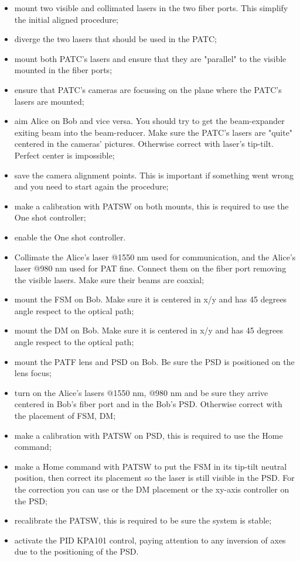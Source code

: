 \begin{itemize}
  \item mount two visible and collimated lasers in the two fiber ports. This simplify the initial aligned procedure;
  \item diverge the two lasers that should be used in the PATC;
  \item mount both PATC's lasers and ensure that they are "parallel" to the visible mounted in the fiber ports;
  \item ensure that PATC's cameras are focussing on the plane where the PATC's lasers are mounted;
  \item aim Alice on Bob and vice versa. You should try to get the beam-expander exiting beam into the beam-reducer. Make sure the PATC's lasers are "quite" centered in the cameras' pictures. Otherwise correct with laser's tip-tilt. Perfect center is impossible;
  \item save the camera alignment points. This is important if something went wrong and you need to start again the procedure;
  \item make a calibration with PATSW on both mounts, this is required to use the One shot controller;
  \item enable the One shot controller.
\end{itemize}

\begin{itemize}
  \item Collimate the Alice's laser @1550 nm used for communication, and the Alice's laser @980 nm used for PAT fine. Connect them on the fiber port removing the visible lasers. Make sure their beams are coaxial;
  \item mount the FSM on Bob. Make sure it is centered in x/y and has 45 degrees angle respect to the optical path;
  \item mount the DM on Bob. Make sure it is centered in x/y and has 45 degrees angle respect to the optical path;
  \item mount the PATF lens and PSD on Bob. Be sure the PSD is positioned on the lens focus;
  \item turn on the Alice's lasers @1550 nm, @980 nm and be sure they arrive centered in Bob's fiber port and in the Bob's PSD. Otherwise correct with the placement of FSM, DM;
  \item make a calibration with PATSW on PSD, this is required to use the Home command;
  \item make a Home command with PATSW to put the FSM in its tip-tilt neutral position, then correct its placement so the laser is still visible in the PSD. For the correction you can use or the DM placement or the xy-axis controller on the PSD;
  \item recalibrate the PATSW, this is required to be sure the system is stable;
  \item activate the PID KPA101 control, paying attention to any inversion of axes due to the positioning of the PSD.
\end{itemize}

